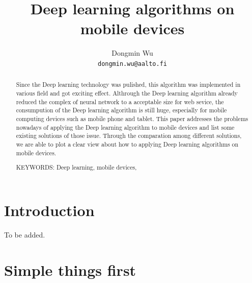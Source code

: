 \documentclass[article]{aaltoseries}
\begin{document}
 

\title{Deep learning algorithms on mobile devices}

\author{Dongmin Wu
\\\textnormal{\texttt{dongmin.wu@aalto.fi}}} %


\maketitle


\begin{abstract}

  Since the Deep learning technology was pulished, this algorithm was
  implemented in various field and got exciting effect. Althrough the Deep learning algorithm 
  already reduced the complex of neural network to a acceptable size for web sevice, the 
  consumpution of the Deep learning algorithm is still huge, especially for mobile computing
  devices such as mobile phone and tablet. This paper addresses the problems nowadays of
  applying the Deep learning algorithm to mobile devices and list some existing solutions
  of those issue. Through the comparation among different solutions, we are able to 
  plot a clear view about how to applying Deep learning algorithms on mobile devices.

\vspace{3mm}
\noindent KEYWORDS: Deep learning, mobile devices,

\end{abstract}




\section{Introduction}

To be added.




\section{Simple things first}
\end{document}
